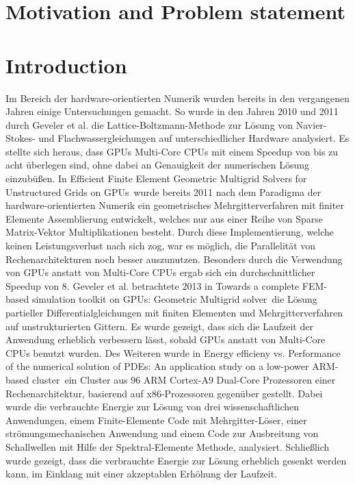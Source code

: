 \section{Motivation and Problem statement}


\section{Introduction}


Im Bereich der hardware-orientierten Numerik wurden bereits in den vergangenen Jahren einige Untersuchungen gemacht. So wurde in den Jahren 2010 und 2011 durch Geveler et al. die Lattice-Boltzmann-Methode zur Lösung von Navier-Stokes- und Flachwassergleichungen auf unterschiedlicher Hardware analysiert. Es stellte sich heraus, dass GPUs Multi-Core CPUs mit einem Speedup von bis zu acht überlegen sind, ohne dabei an Genauigkeit der numerischen Lösung einzubü\ss en. 
In \glqq Efficient Finite Element Geometric Multigrid Solvers for Unstructured Grids on GPUs\grqq\, wurde bereits 2011 nach dem Paradigma der hardware-orientierten Numerik ein geometrisches Mehrgitterverfahren mit finiter Elemente Assemblierung entwickelt, welches nur aus einer Reihe von Sparse Matrix-Vektor Multiplikationen besteht. Durch diese Implementierung, welche keinen Leistungsverlust nach sich zog, war es möglich, die Parallelität von Rechenarchitekturen noch besser auszunutzen. Besonders durch die Verwendung von GPUs anstatt von Multi-Core CPUs ergab sich ein durchschnittlicher Speedup von 8.
Geveler et al. betrachtete 2013 in \glqq 
Towards a complete FEM-based simulation toolkit on GPUs: Geometric Multigrid solver\grqq\, die Lösung partieller Differentialgleichungen mit finiten Elementen und Mehrgitterverfahren auf unstrukturierten Gittern. Es wurde gezeigt, dass sich die Laufzeit der Anwendung erheblich verbessern lässt, sobald GPUs anstatt von Multi-Core CPUs benutzt wurden. 
Des Weiteren wurde in \glqq Energy efficieny vs. Performance of the numerical solution of PDEs: An application study on a low-power ARM-based cluster\grqq\, ein Cluster aus 96 ARM Cortex-A9 Dual-Core Prozessoren einer Rechenarchitektur, basierend auf x86-Prozessoren gegenüber gestellt. Dabei wurde die verbrauchte Energie zur Lösung von drei wissenschaftlichen Anwendungen, einem Finite-Elemente Code mit Mehrgitter-Löser, einer strömungsmechanischen Anwendung und einem Code zur Ausbreitung von Schallwellen mit Hilfe der Spektral-Elemente Methode, analysiert. Schließlich wurde gezeigt, dass die verbrauchte Energie zur Lösung erheblich gesenkt werden kann, im Einklang mit einer akzeptablen Erhöhung der Laufzeit. 
